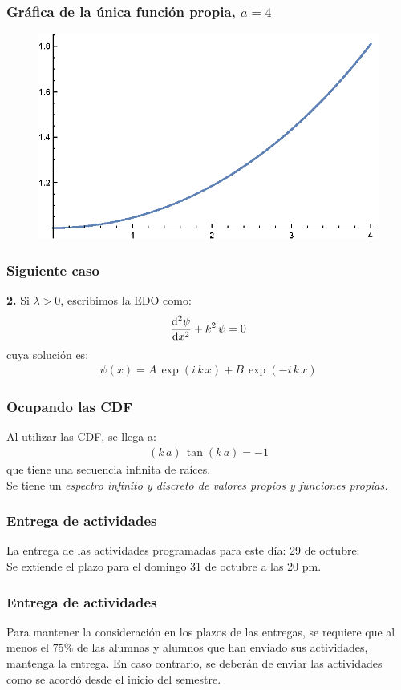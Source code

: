 \documentclass[12pt]{beamer}
\begin{document}
\begin{frame}
\frametitle{Gráfica de la única función propia, $a = 4$}
\begin{figure}
    \centering
    \includegraphics[scale=1]{Imagenes/Ejercicio_SL_02_Funciones.eps}
\end{figure}
\end{frame}
\begin{frame}
\frametitle{Siguiente caso}
\textbf{2.} Si $\lambda > 0$, escribimos la EDO como:
\pause
\begin{align*}
\dv[2]{\psi}{x} + k^{2} \, \psi = 0   
\end{align*}
\pause
cuya solución es:
\pause
\begin{align*}
\psi(x) = A \, \exp(i \, k \, x) +  B \, \exp (- i \, k \, x)
\end{align*}
\end{frame}
\begin{frame}
\frametitle{Ocupando las CDF}
Al utilizar las CDF, se llega a:
\pause
\begin{align*}
(k \, a) \, \tan (k \, a) = -1
\end{align*}
\pause
que tiene una secuencia infinita de raíces.
\\
\bigskip
\pause
Se tiene un \emph{espectro infinito y discreto de valores propios y funciones propias.}
\end{frame}
\begin{frame}
\frametitle{Entrega de actividades}
La entrega de las actividades programadas para este día: 29 de octubre:
\\
\bigskip
\pause
Se extiende el plazo para el domingo 31 de octubre a las 20 pm.
\end{frame}
\begin{frame}
\frametitle{Entrega de actividades}
Para mantener la consideración en los plazos de las entregas, se requiere que al menos el $75\%$ de las alumnas y alumnos que han enviado sus actividades, mantenga la entrega. En caso contrario, se deberán de enviar las actividades como se acordó desde el inicio del semestre.
\end{frame}
\end{document}
